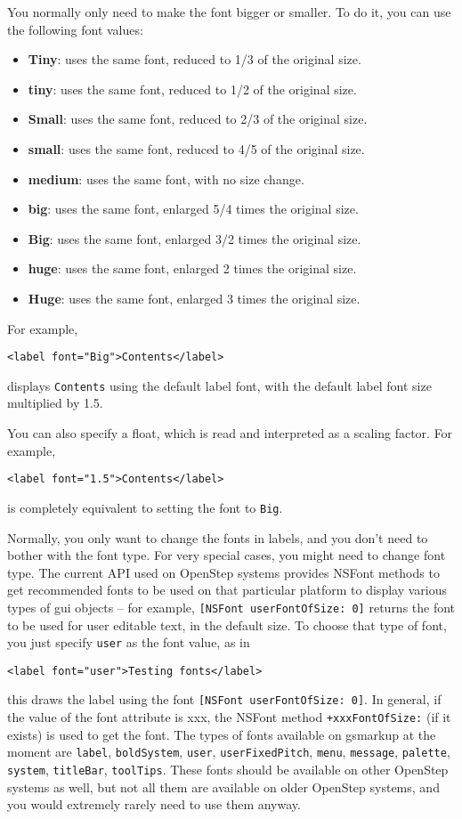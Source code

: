 You normally only need to make the font bigger or smaller.  To do it,
you can use the following font values:
\begin{itemize}
\item {\bf Tiny}: uses the same font, reduced to 1/3 of the original size.
\item {\bf tiny}: uses the same font, reduced to 1/2 of the original size.
\item {\bf Small}: uses the same font, reduced to 2/3 of the original size.
\item {\bf small}: uses the same font, reduced to 4/5 of the original size.
\item {\bf medium}: uses the same font, with no size change.
\item {\bf big}: uses the same font, enlarged 5/4 times the original size.
\item {\bf Big}: uses the same font, enlarged 3/2 times the original size.
\item {\bf huge}: uses the same font, enlarged 2 times the original size.
\item {\bf Huge}: uses the same font, enlarged  3 times the original size.
\end{itemize}
For example,
\begin{verbatim}
<label font="Big">Contents</label>
\end{verbatim}
displays \texttt{Contents} using the default label font, with the
default label font size multiplied by 1.5.

You can also specify a float, which is read and interpreted as a
scaling factor.  For example, 
\begin{verbatim}
<label font="1.5">Contents</label>
\end{verbatim}
is completely equivalent to setting the font to \texttt{Big}.

Normally, you only want to change the fonts in labels, and you don't
need to bother with the font type.  For very special cases, you might
need to change font type.  The current API used on OpenStep systems
provides NSFont methods to get recommended fonts to be used on that
particular platform to display various types of gui objects -- for
example, \texttt{[NSFont userFontOfSize: 0]} returns the font to be
used for user editable text, in the default size.  To choose that type
of font, you just specify \texttt{user} as the font value, as in
\begin{verbatim}
<label font="user">Testing fonts</label>
\end{verbatim}
this draws the label using the font \texttt{[NSFont userFontOfSize:
0]}.  In general, if the value of the font attribute is xxx, the
NSFont method \texttt{+xxxFontOfSize:} (if it exists) is used to get
the font.  The types of fonts available on gsmarkup at the moment are
\texttt{label}, \texttt{boldSystem}, \texttt{user}, 
\texttt{userFixedPitch}, \texttt{menu}, \texttt{message},
\texttt{palette}, \texttt{system}, \texttt{titleBar},
\texttt{toolTips}.  These fonts should be available on other OpenStep
systems as well, but not all them are available on older OpenStep
systems, and you would extremely rarely need to use them anyway.

